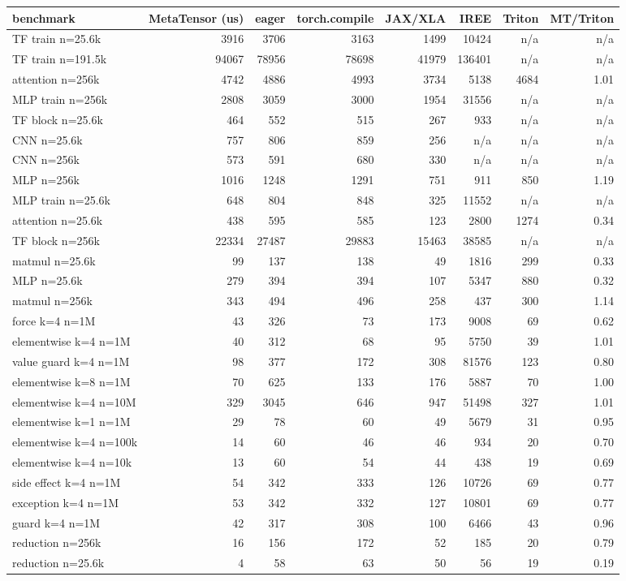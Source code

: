 \begin{tabular}{lrrrrrrr}
\toprule
benchmark & MetaTensor (us) & eager & torch.compile & JAX/XLA & IREE & Triton & MT/Triton \\
\midrule
TF train n=25.6k & 3916 & 3706 & 3163 & 1499 & 10424 & n/a & n/a \\
TF train n=191.5k & 94067 & 78956 & 78698 & 41979 & 136401 & n/a & n/a \\
attention n=256k & 4742 & 4886 & 4993 & 3734 & 5138 & 4684 & 1.01 \\
MLP train n=256k & 2808 & 3059 & 3000 & 1954 & 31556 & n/a & n/a \\
TF block n=25.6k & 464 & 552 & 515 & 267 & 933 & n/a & n/a \\
CNN n=25.6k & 757 & 806 & 859 & 256 & n/a & n/a & n/a \\
CNN n=256k & 573 & 591 & 680 & 330 & n/a & n/a & n/a \\
MLP n=256k & 1016 & 1248 & 1291 & 751 & 911 & 850 & 1.19 \\
MLP train n=25.6k & 648 & 804 & 848 & 325 & 11552 & n/a & n/a \\
attention n=25.6k & 438 & 595 & 585 & 123 & 2800 & 1274 & 0.34 \\
TF block n=256k & 22334 & 27487 & 29883 & 15463 & 38585 & n/a & n/a \\
matmul n=25.6k & 99 & 137 & 138 & 49 & 1816 & 299 & 0.33 \\
MLP n=25.6k & 279 & 394 & 394 & 107 & 5347 & 880 & 0.32 \\
matmul n=256k & 343 & 494 & 496 & 258 & 437 & 300 & 1.14 \\
force k=4 n=1M & 43 & 326 & 73 & 173 & 9008 & 69 & 0.62 \\
elementwise k=4 n=1M & 40 & 312 & 68 & 95 & 5750 & 39 & 1.01 \\
value guard k=4 n=1M & 98 & 377 & 172 & 308 & 81576 & 123 & 0.80 \\
elementwise k=8 n=1M & 70 & 625 & 133 & 176 & 5887 & 70 & 1.00 \\
elementwise k=4 n=10M & 329 & 3045 & 646 & 947 & 51498 & 327 & 1.01 \\
elementwise k=1 n=1M & 29 & 78 & 60 & 49 & 5679 & 31 & 0.95 \\
elementwise k=4 n=100k & 14 & 60 & 46 & 46 & 934 & 20 & 0.70 \\
elementwise k=4 n=10k & 13 & 60 & 54 & 44 & 438 & 19 & 0.69 \\
side effect k=4 n=1M & 54 & 342 & 333 & 126 & 10726 & 69 & 0.77 \\
exception k=4 n=1M & 53 & 342 & 332 & 127 & 10801 & 69 & 0.77 \\
guard k=4 n=1M & 42 & 317 & 308 & 100 & 6466 & 43 & 0.96 \\
reduction n=256k & 16 & 156 & 172 & 52 & 185 & 20 & 0.79 \\
reduction n=25.6k & 4 & 58 & 63 & 50 & 56 & 19 & 0.19 \\
\bottomrule
\end{tabular}
